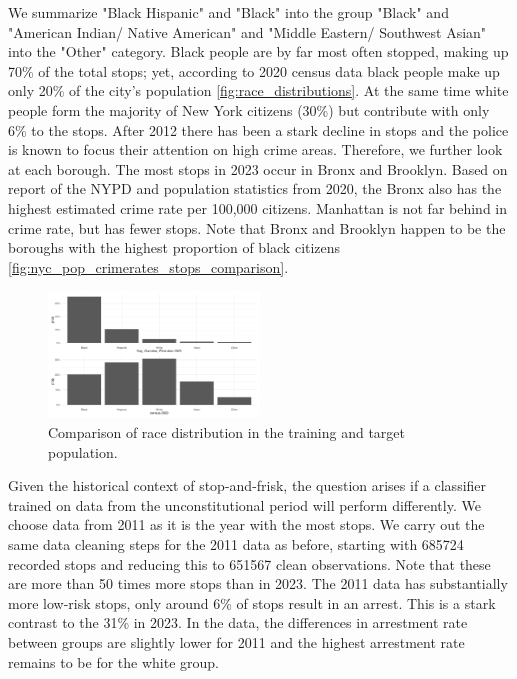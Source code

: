 We summarize "Black Hispanic" and "Black" into the group "Black" and  "American Indian/ Native American" and "Middle Eastern/ Southwest Asian" into the "Other" category. Black people are by far most often stopped, making up 70\% of the total stops; yet, according to 2020 census data black people make up only 20\% of the city's population \autoref{fig:race_distributions}. At the same time white people form the majority of New York citizens (30\%) but contribute with only 6\% to the stops. 
After 2012 there has been a stark decline in stops and the police is known to focus their attention on high crime areas. Therefore, we further look at each borough. 
The most stops in 2023 occur in Bronx and Brooklyn. Based on report of the NYPD and population statistics from 2020, the Bronx also has the highest estimated crime rate per 100,000 citizens. Manhattan is not far behind in crime rate, but has fewer stops. Note that Bronx and Brooklyn happen to be the boroughs with the highest proportion of black citizens \autoref{fig:nyc_pop_crimerates_stops_comparison}.\\
\begin{figure}
    \includegraphics[width=0.5\textwidth]{../figures/sqf_case_study_plot6.png}
    \caption{Comparison of race distribution in the training and target population.}
    \label{fig:race_distributions}
  \end{figure}
  
Given the historical context of stop-and-frisk, the question arises if a classifier trained on data from the unconstitutional period will perform differently.
We choose data from 2011 as it is the year with the most stops. We carry out the same data cleaning steps for the 2011 data as before, starting with 685724 recorded stops and reducing this to 651567 clean observations. Note that these are more than 50 times more stops than in 2023.
The 2011 data has substantially more low-risk stops, only around 6\% of stops result in an arrest. This is a stark contrast to the 31\% in 2023. In the data, the differences in arrestment rate between groups are slightly lower for 2011 and the highest arrestment rate remains to be for the white group.\\

